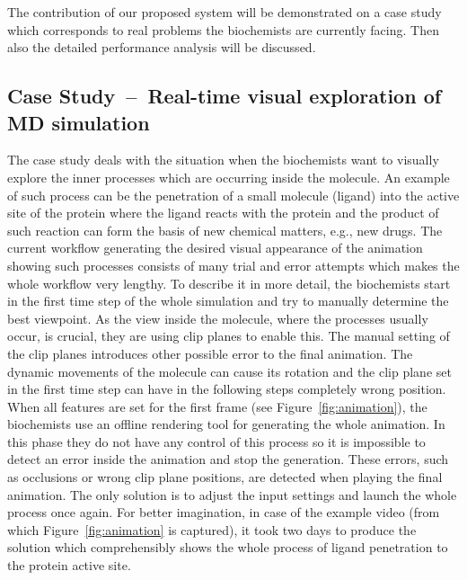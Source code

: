 The contribution of our proposed system will be demonstrated on a case study which corresponds to real problems the biochemists are currently facing. 
Then also the detailed performance analysis will be discussed.

\subsection{Case Study~--~Real-time visual exploration of MD simulation}
The case study deals with the situation when the biochemists want to visually explore the inner processes which are occurring inside the molecule. 
An example of such process can be the penetration of a small molecule (ligand) into the active site of the protein where the ligand reacts with the protein and the product of such reaction can form the basis of new chemical matters, e.g., new drugs. 
The current workflow generating the desired visual appearance of the animation showing such processes consists of many trial and error attempts which makes the whole workflow very lengthy. 
To describe it in more detail, the biochemists start in the first time step of the whole simulation and try to manually determine the best viewpoint.
As the view inside the molecule, where the processes usually occur, is crucial, they are using clip planes to enable this.
The manual setting of the clip planes introduces other possible error to the final animation.
The dynamic movements of the molecule can cause its rotation and the clip plane set in the first time step can have in the following steps completely wrong position.
When all features are set for the first frame (see Figure~\ref{fig:animation}), the biochemists use an offline rendering tool for generating the whole animation.
In this phase they do not have any control of this process so it is impossible to detect an error inside the animation and stop the generation.
These errors, such as occlusions or wrong clip plane positions, are detected when playing the final animation.
The only solution is to adjust the input settings and launch the whole process once again.
For better imagination, in case of the example video (from which Figure~\ref{fig:animation} is captured), it took two days to produce the solution which comprehensibly shows the whole process of ligand penetration to the protein active site.

